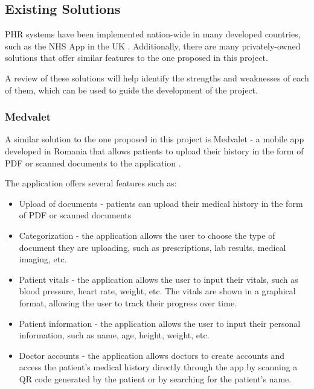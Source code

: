 \subsection{Existing Solutions}

PHR systems have been implemented nation-wide in many developed countries, such as the NHS App in the UK \parencite{phrlist}. Additionally, there are many privately-owned solutions that offer similar features to the one proposed in this project. 

A review of these solutions will help identify the strengths and weaknesses of each of them, which can be used to guide the development of the project.

\subsubsection{Medvalet}

A similar solution to the one proposed in this project is Medvalet - a mobile app developed in Romania that allows patients to upload their history in the form of PDF or scanned documents to the application \parencite{medvalet}. 

The application offers several features such as:
\begin{itemize}
    \item Upload of documents - patients can upload their medical history in the form of PDF or scanned documents
    \item Categorization - the application allows the user to choose the type of document they are uploading, such as prescriptions, lab results, medical imaging, etc.
    \item Patient vitals - the application allows the user to input their vitals, such as blood pressure, heart rate, weight, etc. The vitals are shown in a graphical format, allowing the user to track their progress over time.
    \item Patient information - the application allows the user to input their personal information, such as name, age, height, weight, etc.
    \item Doctor accounts - the application allows doctors to create accounts and access the patient's medical history directly through the app by scanning a QR code generated by the patient or by searching for the patient's name.
\end{itemize}


